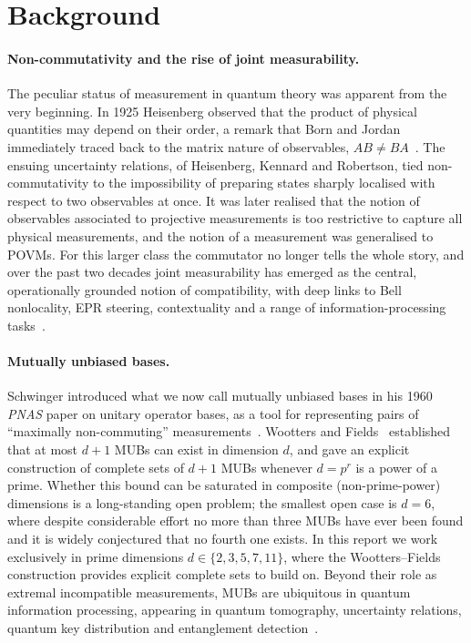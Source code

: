 \documentclass[oneside, a4paper, onecolumn, 11pt]{article}
\theoremstyle{definition}
\theoremstyle{plain}
\theoremstyle{remark}
\begin{document}
\section{Background}
 
\paragraph{Non-commutativity and the rise of joint measurability.}
The peculiar status of measurement in quantum theory was apparent from the very
beginning. In 1925 Heisenberg observed that the product of physical quantities
may depend on their order, a remark that Born and Jordan immediately traced back
to the matrix nature of observables, $AB \neq BA$~\cite{Guhne2023}. The ensuing
uncertainty relations, of Heisenberg, Kennard and Robertson, tied
non-commutativity to the impossibility of preparing states sharply localised
with respect to two observables at once. It was later realised that the notion of observables associated to projective measurements
is too restrictive to capture all physical measurements, and the
notion of a measurement was generalised to POVMs. For this larger class the
commutator no longer tells the whole story, and over the past two decades joint
measurability has emerged as the central, operationally grounded notion of
compatibility, with deep links to Bell nonlocality, EPR steering, contextuality
and a range of information-processing tasks~\cite{Quintino2019,Guhne2023}.
 
\paragraph{Mutually unbiased bases.}
Schwinger introduced what we now call mutually unbiased bases in his 1960
\emph{PNAS} paper on unitary operator bases, as a tool for representing pairs of
``maximally non-commuting'' measurements~\cite{Schwinger1960}. Wootters and
Fields~\cite{WoottersFields1989} established that at most $d+1$ MUBs can exist in
dimension $d$, and gave an explicit construction of complete sets of $d+1$ MUBs
whenever $d = p^{r}$ is a power of a prime. Whether this bound can be saturated
in composite (non-prime-power) dimensions is a long-standing open problem; the
smallest open case is $d = 6$, where despite considerable effort no more than
three MUBs have ever been found and it is widely conjectured that no fourth one
exists. In this report we work exclusively in prime dimensions $d \in
\{2,3,5,7, 11\}$, where the Wootters--Fields construction provides explicit complete
sets to build on. Beyond their role as extremal incompatible measurements, MUBs
are ubiquitous in quantum information processing, appearing in quantum
tomography, uncertainty relations, quantum key distribution and entanglement
detection~\cite{Designolle2019}.
 
\end{document}
